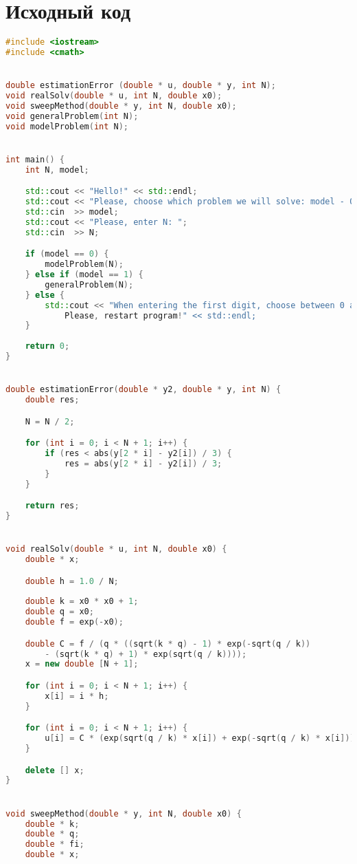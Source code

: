 \documentclass[a4paper,12pt,titlepage]{article}
\begin{document}
\section{Исходный код}
\begin{lstlisting}[language=C++, caption={Исходный код программы}]
#include <iostream>
#include <cmath>


double estimationError (double * u, double * y, int N);
void realSolv(double * u, int N, double x0);
void sweepMethod(double * y, int N, double x0);
void generalProblem(int N);
void modelProblem(int N);


int main() {
    int N, model;

    std::cout << "Hello!" << std::endl;
    std::cout << "Please, choose which problem we will solve: model - 0, general - 1.\nEnter a number: ";
    std::cin  >> model;
    std::cout << "Please, enter N: ";
    std::cin  >> N;

    if (model == 0) {
        modelProblem(N);
    } else if (model == 1) {
        generalProblem(N);
    } else {
        std::cout << "When entering the first digit, choose between 0 and 1!\n 
            Please, restart program!" << std::endl;
    }
    
    return 0;
}


double estimationError(double * y2, double * y, int N) {
    double res;

    N = N / 2;

    for (int i = 0; i < N + 1; i++) {
        if (res < abs(y[2 * i] - y2[i]) / 3) {
            res = abs(y[2 * i] - y2[i]) / 3;
        }
    }

    return res;
}


void realSolv(double * u, int N, double x0) {
    double * x;

    double h = 1.0 / N;
    
    double k = x0 * x0 + 1;
    double q = x0;
    double f = exp(-x0); 

    double C = f / (q * ((sqrt(k * q) - 1) * exp(-sqrt(q / k)) 
        - (sqrt(k * q) + 1) * exp(sqrt(q / k))));
    x = new double [N + 1];

    for (int i = 0; i < N + 1; i++) {
        x[i] = i * h;
    }

    for (int i = 0; i < N + 1; i++) {
        u[i] = C * (exp(sqrt(q / k) * x[i]) + exp(-sqrt(q / k) * x[i])) + f / q;
    }

    delete [] x;
}


void sweepMethod(double * y, int N, double x0) {
    double * k;
    double * q;
    double * fi;
    double * x;
    

\end{lstlisting}
\end{document}
